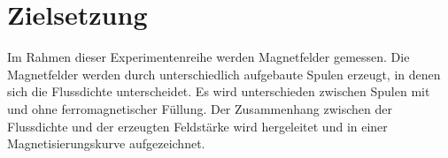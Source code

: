 \section{Zielsetzung}
\label{sec:Ziel}
Im Rahmen dieser Experimentenreihe werden Magnetfelder gemessen. Die Magnetfelder werden durch unterschiedlich aufgebaute Spulen erzeugt, in denen sich die Flussdichte unterscheidet.
Es wird unterschieden zwischen Spulen mit und ohne ferromagnetischer Füllung.
Der Zusammenhang zwischen der Flussdichte und der erzeugten Feldstärke wird hergeleitet und in einer Magnetisierungskurve aufgezeichnet.
